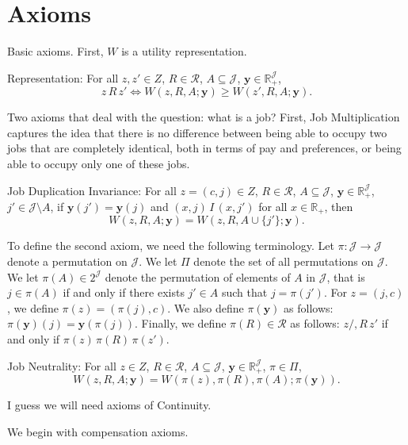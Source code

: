 \section{Axioms}
Basic axioms. First, $W$ is a utility representation.

Representation: For all $z,z'\in Z$, $R\in \mathcal{R}$, $A\subseteq \mathcal{J}$, $\mathbf{y}\in \mathbb{R}_{+}^{\mathcal{J}}$, 
\begin{equation*}
\label{label1}
z\,R\,z'\Leftrightarrow W(z,R,A;\mathbf{y})\geq W(z',R,A;\mathbf{y}).
\end{equation*}

Two axioms that deal with the question: what is a job? First, Job Multiplication captures the idea that there is no difference between being able to occupy two jobs that are completely identical, both in terms of pay and preferences, or being able to occupy only one of these jobs.

Job Duplication Invariance: For all $z=(c,j)\in Z$, $R\in \mathcal{R}$, $A\subseteq \mathcal{J}$, $\mathbf{y}\in \mathbb{R}_{+}^{\mathcal{J}}$, $j'\in \mathcal{J}\setminus A$, if $\mathbf{y}(j')=\mathbf{y}(j)$ and $(x,j)\,I\,(x,j')$ for all $x\in\mathbb{R}_{+}$, then
\begin{equation*}
\label{label2}
W(z,R,A;\mathbf{y})=W(z,R,A\cup\{j'\};\mathbf{y}).
\end{equation*}

To define the second axiom, we need the following terminology. Let $\pi:\mathcal{J}\rightarrow \mathcal{J}$ denote a permutation on $\mathcal{J}$. We let $\Pi$ denote the set of all permutations on $\mathcal{J}$. We let $\pi(A)\in 2^{\mathcal{J}}$ denote the permutation of elements of $A$ in $\mathcal{J}$, that is $j\in\pi(A)$ if and only if there exists $j'\in A$ such that $j=\pi(j')$. For $z=(j,c)$, we define $\pi(z)=(\pi(j),c)$. We also define $\pi(\mathbf{y})$ as follows: $\pi(\mathbf{y})(j)=\mathbf{y}(\pi(j))$. Finally, we define $\pi(R)\in\mathcal{R}$ as follows: $z/,R\,z'$ if and only if $\pi(z)\,\pi(R)\,\pi(z')$.

Job Neutrality: For all $z\in Z$, $R\in \mathcal{R}$, $A\subseteq \mathcal{J}$, $\mathbf{y}\in \mathbb{R}_{+}^{\mathcal{J}}$, $\pi\in\Pi$,
\begin{equation*}
\label{ }
W(z,R,A;\mathbf{y})=W(\pi(z),\pi(R),\pi(A);\pi(\mathbf{y})).
\end{equation*}

I guess we will need axioms of Continuity.

We begin with compensation axioms.

